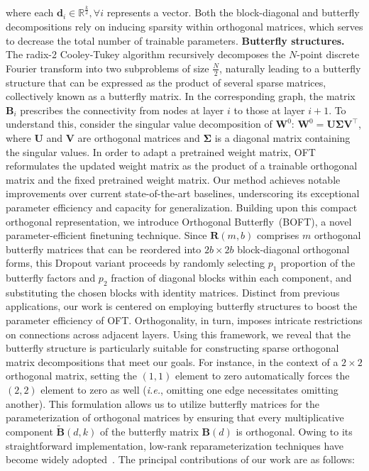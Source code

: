 where each $\bm{d}_i\in\mathbb{R}^{\frac{k}{2}}, \forall i$ represents a vector. Both the block-diagonal and butterfly decompositions rely on inducing sparsity within orthogonal matrices, which serves to decrease the total number of trainable parameters. \textbf{Butterfly structures.} The radix-2 Cooley-Tukey algorithm recursively decomposes the $N$-point discrete Fourier transform into two subproblems of size $\frac{N}{2}$, naturally leading to a butterfly structure that can be expressed as the product of several sparse matrices, collectively known as a butterfly matrix. In the corresponding graph, the matrix $\bm{B}_i$ prescribes the connectivity from nodes at layer $i$ to those at layer $i+1$. To understand this, consider the singular value decomposition of $\bm{W}^0$: $\bm{W}^0=\bm{U}\bm{\Sigma}\bm{V}^\top$, where $\bm{U}$ and $\bm{V}$ are orthogonal matrices and $\bm{\Sigma}$ is a diagonal matrix containing the singular values. In order to adapt a pretrained weight matrix, OFT reformulates the updated weight matrix as the product of a trainable orthogonal matrix and the fixed pretrained weight matrix. Our method achieves notable improvements over current state-of-the-art baselines, underscoring its exceptional parameter efficiency and capacity for generalization. Building upon this compact orthogonal representation, we introduce Orthogonal Butterfly~(BOFT), a novel parameter-efficient finetuning technique. Since $\bm{R}(m, b)$ comprises $m$ orthogonal butterfly matrices that can be reordered into $2b\times 2b$ block-diagonal orthogonal forms, this Dropout variant proceeds by randomly selecting $p_1$ proportion of the butterfly factors and $p_2$ fraction of diagonal blocks within each component, and substituting the chosen blocks with identity matrices. Distinct from previous applications, our work is centered on employing butterfly structures to boost the parameter efficiency of OFT. Orthogonality, in turn, imposes intricate restrictions on connections across adjacent layers. Using this framework, we reveal that the butterfly structure is particularly suitable for constructing sparse orthogonal matrix decompositions that meet our goals. For instance, in the context of a $2\times 2$ orthogonal matrix, setting the $(1,1)$ element to zero automatically forces the $(2,2)$ element to zero as well (\emph{i.e.}, omitting one edge necessitates omitting another). This formulation allows us to utilize butterfly matrices for the parameterization of orthogonal matrices by ensuring that every multiplicative component $\tilde{\bm{B}}(d,k)$ of the butterfly matrix $\bm{B}(d)$ is orthogonal. Owing to its straightforward implementation, low-rank reparameterization techniques have become widely adopted~\cite{dettmers2023qlora,zi2023delta,chavan2023one}. The principal contributions of our work are as follows:

